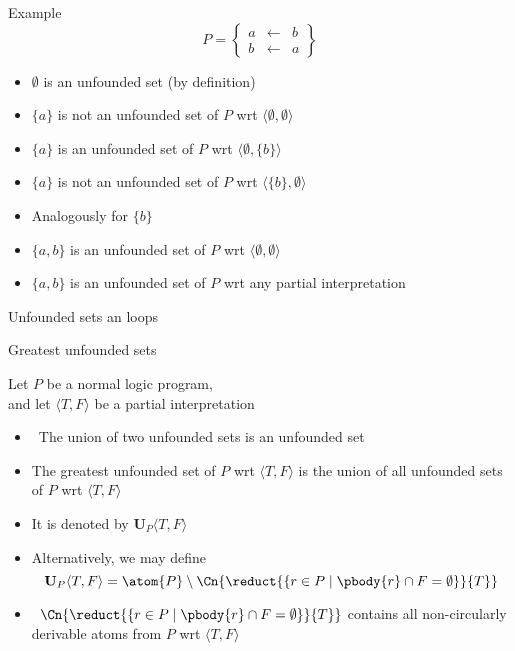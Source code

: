\begin{frame}{Example}
%
\[
P
=
\left\{
  \begin{array}{lcl}
    a &\leftarrow & b \\
    b &\leftarrow & a
  \end{array}
\right\}
\]
\medskip
\begin{itemize}
\item<2-> $\emptyset$ is an unfounded set (by definition)
\smallskip
\item<3-> $\{a\}$ is not an unfounded set of $P$ wrt $\langle\emptyset,\emptyset\rangle$
\item<4-> $\{a\}$ is     an unfounded set of $P$ wrt $\langle\emptyset,\{b\}\rangle$
\item<5-> $\{a\}$ is not an unfounded set of $P$ wrt $\langle\{b\},\emptyset\rangle$
\smallskip
\item<6> Analogously for $\{b\}$
\smallskip
\item<7-> $\{a,b\}$ is     an unfounded set of $P$ wrt $\langle\emptyset,\emptyset\rangle$
\item<8-> $\{a,b\}$ is     an unfounded set of $P$ wrt any partial interpretation
\end{itemize}

\end{frame}
\begin{frame}{Unfounded sets an loops}

\end{frame}
\begin{frame}{Greatest unfounded sets}\label{unf:greatest}

Let $P$ be a normal logic program,\\ and let
$\langle T,F \rangle$ be a partial interpretation

\begin{itemize}
\item<2->  \ The union of two unfounded sets is an unfounded set
\item<3-> The \alert{greatest unfounded set} of $P$ wrt $\langle T,F \rangle$ is the
  union of all unfounded sets of $P$ wrt $\langle T,F \rangle$
\item<4-> [] It is denoted by $\mathbf{U}_P\langle T,F \rangle$
\item<5-> Alternatively, we may define
  \[
  \mathbf{U}_P\langle T,F \rangle =
  \atom{P} \setminus
  \Cn{\reduct{\{r \in P \mid \pbody{r} \cap F = \emptyset\}}{T}}\/
  \]
\item<6->  \
  \(
  \Cn{\reduct{\{r \in P \mid \pbody{r} \cap F = \emptyset\}}{T}}
  \)
  contains all non-circularly derivable atoms from $P$ wrt $\langle T,F \rangle$
\end{itemize}
\end{frame}
%
